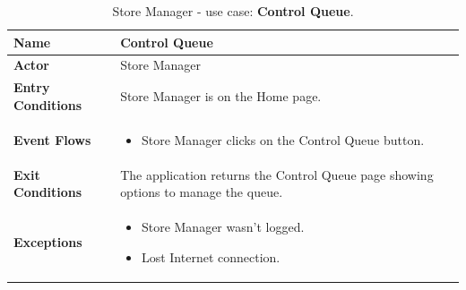 \begin{table}[H]
    \centering
    \begin{tabular}{| m{} | m{} |}
        \hline
        \textbf{Name}            & Control Queue                                                                       \\
        \hline
        \textbf{Actor}            & Store Manager                                                                       \\
        \hline
        \textbf{Entry Conditions} & Store Manager is on the Home page.                                                  \\
        \hline
        \textbf{Event Flows} &
        \begin{itemize}
            \item Store Manager clicks on the Control Queue button.
        \end{itemize} \\
        \hline
        \textbf{Exit Conditions}  & The application returns the Control Queue page showing options to manage the queue. \\
        \hline
        \textbf{Exceptions} &
        \begin{itemize}
            \item Store Manager wasn't logged.
            \item Lost Internet connection.
        \end{itemize} \\
        \hline
    \end{tabular}
    \caption{Store Manager - use case: \textbf{Control Queue}.}
    \label{tableGetStatus}
\end{table}


